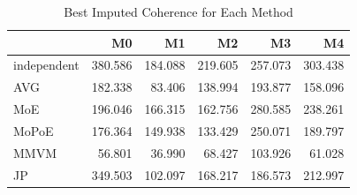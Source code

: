 \begin{table}
\caption{Best Imputed Coherence for Each Method}
\label{tab:best_imputed_coherence}
\begin{tabular}{lrrrrr}
\toprule
 & M0 & M1 & M2 & M3 & M4 \\
\midrule
independent & 380.586 & 184.088 & 219.605 & 257.073 & 303.438 \\
AVG & 182.338 & 83.406 & 138.994 & 193.877 & 158.096 \\
MoE & 196.046 & 166.315 & 162.756 & 280.585 & 238.261 \\
MoPoE & 176.364 & 149.938 & 133.429 & 250.071 & 189.797 \\
MMVM & 56.801 & 36.990 & 68.427 & 103.926 & 61.028 \\
JP & 349.503 & 102.097 & 168.217 & 186.573 & 212.997 \\
\bottomrule
\end{tabular}
\end{table}
